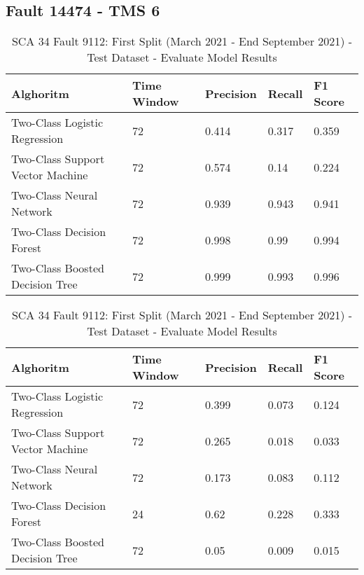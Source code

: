 \subsection{Fault 14474 - TMS 6}

\begin{table}[!ht]
    \centering
    \begin{tabular}{|l|l|l|l|l|}
    \hline
        Alghoritm & Time Window & Precision & Recall & F1 Score \\ \hline
        Two-Class Logistic Regression & 72 & 0.414 & 0.317 & 0.359 \\ \hline
        Two-Class Support Vector Machine & 72 & 0.574 & 0.14 & 0.224 \\ \hline
        Two-Class Neural Network & 72 & 0.939 & 0.943 & 0.941 \\ \hline
        Two-Class Decision Forest & 72 & 0.998 & 0.99 & 0.994 \\ \hline
        Two-Class Boosted Decision Tree & 72 & 0.999 & 0.993 & 0.996 \\ \hline
    \end{tabular}
    \caption{SCA 34 Fault 9112: First Split (March 2021 - End September 2021) - Test Dataset - Evaluate Model Results}
    \label{9112_SCA34_1st}
\end{table}

\begin{table}[!ht]
    \centering
    \begin{tabular}{|l|l|l|l|l|}
    \hline
        Alghoritm & Time Window & Precision & Recall & F1 Score \\ \hline
        Two-Class Logistic Regression & 72 & 0.399 & 0.073 & 0.124 \\ \hline
        Two-Class Support Vector Machine & 72 & 0.265 & 0.018 & 0.033 \\ \hline
        Two-Class Neural Network & 72 & 0.173 & 0.083 & 0.112 \\ \hline
        Two-Class Decision Forest & 24 & 0.62 & 0.228 & 0.333 \\ \hline
        Two-Class Boosted Decision Tree & 72 & 0.05 & 0.009 & 0.015 \\ \hline
    \end{tabular}
    \caption{SCA 34 Fault 9112: First Split (March 2021 - End September 2021) - Test Dataset - Evaluate Model Results}
    \label{9112_SCA34_1st}
\end{table}

